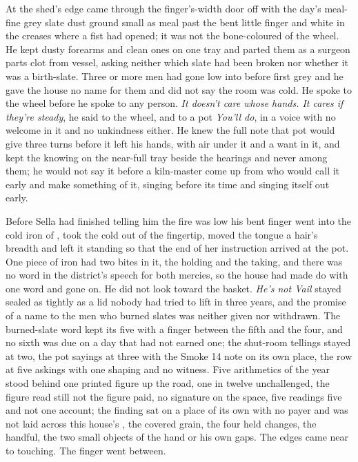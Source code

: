 At the shed's edge  came through the finger's-width door off  with the day's meal-fine grey slate dust ground small as meal past the bent little finger and white in the creases where a fist had opened; it was not the bone-coloured  of the wheel. He kept dusty forearms and clean ones on one tray and parted them as a surgeon parts clot from vessel, asking neither which slate had been broken nor whether it was a birth-slate. Three or more men had gone low into  before first grey and he gave the house no name for them and did not say the room was cold. He spoke to the wheel before he spoke to any person. \emph{It doesn't care whose hands. It cares if they're steady}, he said to the wheel, and to a pot \emph{You'll do}, in a voice with no welcome in it and no unkindness either. He knew the full note that pot would give three turns before it left his hands, with air under it and a want in it, and kept the knowing on the near-full tray beside the hearings and never among them; he would not say it before a kiln-master come up from  who would call it early and make something of it, singing before its time and singing itself out early.

Before Sella had finished telling him the fire was low his bent finger went into the cold iron of , took the cold out of the fingertip, moved the tongue a hair's breadth and left it standing so that the end of her instruction arrived at the pot. One piece of iron had two bites in it, the holding and the taking, and there was no word in the district's speech for both mercies, so the house had made do with one word and gone on. He did not look toward the basket. \emph{He's not Vail} stayed sealed as tightly as a lid nobody had tried to lift in three years, and the promise of a name to the men who burned slates was neither given nor withdrawn. The burned-slate word kept its five with a finger between the fifth and the four, and no sixth was due on a day that had not earned one; the shut-room tellings stayed at two, the pot sayings at three with the Smoke 14 note on its own place, the row at five askings with one shaping and no witness. Five arithmetics of the year stood behind one printed figure up the road, one in twelve unchallenged, the figure read still not the figure paid, no signature on the space, five readings five and not one account; the finding sat on a place of its own with no payer and was not laid across this house's , the covered grain, the four held changes, the handful, the two small objects of the hand or his own gaps. The edges came near to touching. The finger went between.

